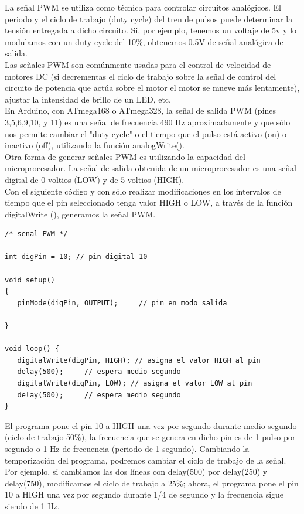 La señal PWM se utiliza como técnica para controlar circuitos analógicos. El periodo y el ciclo de trabajo (duty cycle) del tren de pulsos puede determinar la tensión entregada a dicho circuito. Si, por ejemplo, tenemos un voltaje de 5v y lo modulamos con un duty cycle del 10\%, obtenemos 0.5V de señal analógica de salida.\\
Las señales PWM son comúnmente usadas para el control de velocidad de motores DC (si decrementas el ciclo de trabajo sobre la señal de control del circuito de potencia que actúa sobre el motor el motor se mueve más lentamente), ajustar la intensidad de brillo de un LED, etc.\\
En Arduino, con ATmega168 o ATmega328, la señal de salida PWM (pines 3,5,6,9,10, y 11) es una señal de frecuencia 490 Hz aproximadamente y que sólo nos permite cambiar el "duty cycle" o el tiempo que el pulso está activo (on) o inactivo (off), utilizando la función analogWrite().\\
Otra forma de generar señales PWM es utilizando la capacidad del microprocesador. La señal de salida obtenida de un microprocesador es una señal digital de 0 voltios (LOW) y de 5 voltios (HIGH).\\
Con el siguiente código y con sólo realizar modificaciones en los intervalos de tiempo que el pin seleccionado tenga valor HIGH o LOW, a través de la función digitalWrite (), generamos la señal PWM.
\begin{lstlisting}
/* senal PWM */

int digPin = 10; // pin digital 10

void setup() 
{
   pinMode(digPin, OUTPUT);     // pin en modo salida

}

void loop() {
   digitalWrite(digPin, HIGH); // asigna el valor HIGH al pin 
   delay(500);     // espera medio segundo
   digitalWrite(digPin, LOW); // asigna el valor LOW al pin
   delay(500);     // espera medio segundo
}
\end{lstlisting}
El programa pone el pin 10 a HIGH una vez por segundo durante medio segundo (ciclo de trabajo 50\%), la frecuencia que se genera en dicho pin es de 1 pulso por segundo o 1 Hz de frecuencia (periodo de 1 segundo). Cambiando la temporización del programa, podremos cambiar el ciclo de trabajo de la señal. Por ejemplo, si cambiamos las dos líneas con delay(500) por delay(250) y delay(750), modificamos el ciclo de trabajo a 25\%; ahora, el programa pone el pin 10 a HIGH una vez por segundo durante 1/4 de segundo y la frecuencia sigue siendo de 1 Hz.\\
